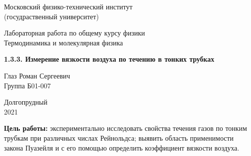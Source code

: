 \documentclass[a4paper, 12pt]{article} %
\begin{document}


\begin{titlepage}

    \newpage
    \begin{center}
        \normalsize Московский физико-технический институт \\(госудраственный университет)
    \end{center}

    \vspace{6em}

    \begin{center}
        \Large Лабораторная работа по общему курсу физики\\Термодинамика и молекулярная физика
    \end{center}

    \vspace{1em}

    \begin{center}
        \Large \textbf{1.3.3. Измерение вязкости воздуха по течению в тонких трубках }
    \end{center}

    \vspace{2em}

    \begin{center}
        \large Глаз Роман Сергеевич\\
        Группа Б01-007
    \end{center}

    \vspace{\fill}

    \begin{center}
        Долгопрудный \\2021
    \end{center}
    
\end{titlepage}


    \thispagestyle{empty}
    \newpage
    \tableofcontents
    \newpage
    \setcounter{page}{1}



\textbf{Цель работы:} экспериментально исследовать свойства течения газов по тонким трубкам при различных числах Рейнольдса; выявить область применимости закона Пуазейля и с его помощью определить коэффициент вязкости воздуха.\\
\end{document}
